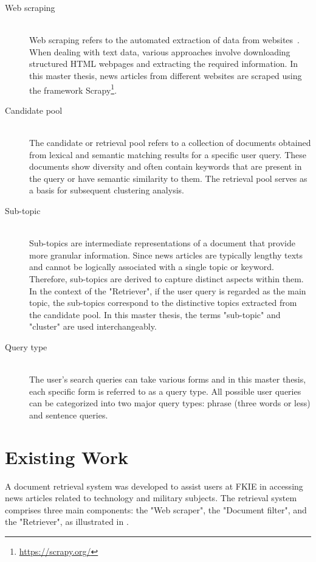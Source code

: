\begin{description}
	\item[Web scraping] \hfill \\ Web scraping refers to the automated extraction of data from websites~\cite{khder2021web}. When dealing with text data, various approaches involve downloading structured HTML webpages and extracting the required information. In this master thesis, news articles from different websites are scraped using the framework Scrapy\footnote{\url{https://scrapy.org/}}.  
	
	\item[Candidate pool] \hfill \\ The candidate or retrieval pool refers to a collection of documents obtained from lexical and semantic matching results for a specific user query. These documents show diversity and often contain keywords that are present in the query or have semantic similarity to them. The retrieval pool serves as a basis for subsequent clustering analysis.
	
	\item[Sub-topic] \hfill \\ Sub-topics are intermediate representations of a document that provide more granular information. Since news articles are typically lengthy texts and cannot be logically associated with a single topic or keyword. Therefore, sub-topics are derived to capture distinct aspects within them. In the context of the "Retriever", if the user query is regarded as the main topic, the sub-topics correspond to the distinctive topics extracted from the candidate pool. In this master thesis, the terms "sub-topic" and "cluster" are used interchangeably. 
	
	\item[Query type] \hfill \\ The user's search queries can take various forms and in this master thesis, each specific form is referred to as a query type. All possible user queries can be categorized into two major query types: phrase (three words or less) and sentence queries.
	
\end{description}

\section{Existing Work}

A document retrieval system was developed to assist users at \ac{FKIE} in accessing news articles related to technology and military subjects. The retrieval system comprises three main components: the "Web scraper", the "Document filter", and the "Retriever", as illustrated in .


